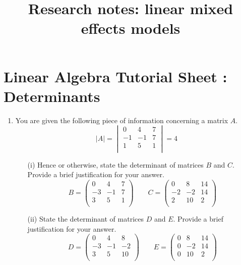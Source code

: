 \documentclass[12pt, a4paper]{report}
\title{Research notes: linear mixed effects models}
\author{ } \date{ }
\theoremstyle{plain}
\theoremstyle{definition}
\theoremstyle{remark}
\begin{document}
\section*{Linear Algebra Tutorial Sheet : Determinants}
\begin{enumerate}
    \item 


You are given the following piece of information concerning a matrix $A$.
\[|A| = \begin{vmatrix}
0  &  4   & 7 \\
-1  & -1  &  7\\
1   & 5  &  1\\
\end{vmatrix} = 4 \]

\begin{itemize}
\item[(i)] Hence or otherwise, state the determinant of matrices $B$ and $C$. Provide a brief justification for your answer.
\[B = \left(\begin{array}{rrr}
0  &  4   & 7 \\
-3  & -1  &  7\\
3   & 5  &  1\\
\end{array}\right) \qquad C = \left(\begin{array}{rrr}
0  &  8   & 14 \\
-2  & -2  &  14\\
2   & 10  &  2\\
\end{array}\right) \]

\item[(ii)] State the determinant of matrices $D$ and $E$. Provide a brief justification for your answer.
\[D = \left(\begin{array}{rrr}
0  &  4   & 8 \\
-3  & -1  &  -2\\
3   & 5  &  10\\
\end{array}\right) \qquad E = \left(\begin{array}{rrr}
0  &  8   & 14 \\
0  & -2  &  14\\
0   & 10  &  2\\
\end{array}\right) \]
\end{itemize}

\end{enumerate}
\end{document}
